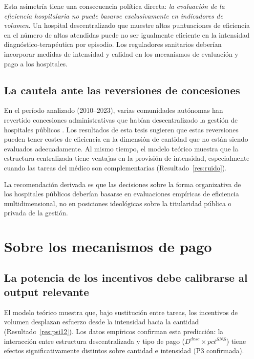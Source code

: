 Esta asimetría tiene una consecuencia política directa: \textit{la evaluación de la eficiencia hospitalaria no puede basarse exclusivamente en indicadores de volumen}. Un hospital descentralizado que muestre altas puntuaciones de eficiencia en el número de altas atendidas puede no ser igualmente eficiente en la intensidad diagnóstico-terapéutica por episodio. Los reguladores sanitarios deberían incorporar medidas de intensidad y calidad en los mecanismos de evaluación y pago a los hospitales.

\subsection{La cautela ante las reversiones de concesiones}

En el período analizado (2010--2023), varias comunidades autónomas han revertido concesiones administrativas que habían descentralizado la gestión de hospitales públicos \citep{repullo2008}. Los resultados de esta tesis sugieren que estas reversiones pueden tener costes de eficiencia en la dimensión de cantidad que no están siendo evaluados adecuadamente. Al mismo tiempo, el modelo teórico muestra que la estructura centralizada tiene ventajas en la provisión de intensidad, especialmente cuando las tareas del médico son complementarias (Resultado~\ref{res:ruido}).

La recomendación derivada es que las decisiones sobre la forma organizativa de los hospitales públicos deberían basarse en evaluaciones empíricas de eficiencia multidimensional, no en posiciones ideológicas sobre la titularidad pública o privada de la gestión.

\section{Sobre los mecanismos de pago}

\subsection{La potencia de los incentivos debe calibrarse al output relevante}

El modelo teórico muestra que, bajo sustitución entre tareas, los incentivos de volumen desplazan esfuerzo desde la intensidad hacia la cantidad (Resultado~\ref{res:psi12}). Los datos empíricos confirman esta predicción: la interacción entre estructura descentralizada y tipo de pago ($D^{desc}\times pct^{SNS}$) tiene efectos significativamente distintos sobre cantidad e intensidad (P3 confirmada).

